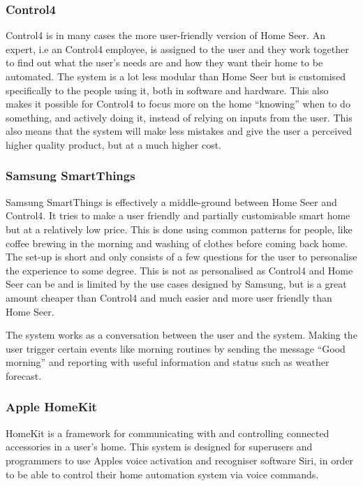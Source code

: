 \subsubsection{Control4}
Control4 is in many cases the more user-friendly version of Home Seer. An expert, i.e an Control4 employee, is assigned to the user and they work together to find out what the user's needs are and how they want their home to be automated. The system is a lot less modular than Home Seer but is customised specifically to the people using it, both in software and hardware. This also makes it possible for Control4 to focus more on the home \enquote{knowing} when to do something, and actively doing it, instead of relying on inputs from the user. This also means that the system will make less mistakes and give the user a perceived higher quality product, but at a much higher cost.\cite{control4}

\subsubsection{Samsung SmartThings}
Samsung SmartThings is effectively a middle-ground between Home Seer and Control4. It tries to make a user friendly and partially customisable smart home but at a relatively low price. This is done using common patterns for people, like coffee brewing in the morning and washing of clothes before coming back home. The set-up is short and only consists of a few questions for the user to personalise the experience to some degree. This is not as personalised as Control4 and Home Seer can be and is limited by the use cases designed by Samsung, but is a great amount cheaper than Control4 and much easier and more user friendly than Home Seer.

The system works as a conversation between the user and the system. Making the user trigger certain events like morning routines by sending the message \enquote{Good morning} and reporting with useful information and status such as weather forecast.

\subsubsection{Apple HomeKit}
HomeKit is a framework for communicating with and controlling connected accessories in a user's home. %
This system is designed for superusers and programmers to use Apples voice activation and recogniser software Siri, in order to be able to control their home automation system via voice commands.


